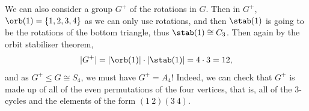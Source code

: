 We can also consider a group $G^+$ of the rotations in $G$. Then in $G^+$, $\orb(1) = \{1, 2, 3, 4\}$ as we can only use rotations, and then $\stab(1)$ is going to be the rotations of the bottom triangle, thus $\stab(1) \cong C_3$. Then again by the orbit stabiliser theorem,
$$
|G^+| = |\orb(1)| \cdot |\stab(1)| = 4 \cdot 3 = 12,
$$
and as $G^+ \leq G \cong S_4$, we must have $G^+ = A_4$!
Indeed, we can check that $G^+$ is made up of all of the even permutations of the four vertices, that is, all of the 3-cycles and the elements of the form $(1\ 2)(3\ 4)$. 
\begin{center}
	


\begin{tikzpicture}[x=0.75pt,y=0.75pt,yscale=-1,xscale=1]


\end{tikzpicture}
\end{center}
